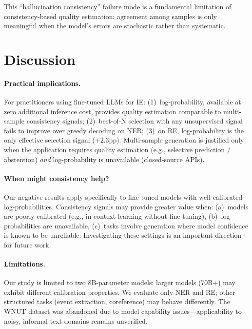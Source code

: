 \documentclass[11pt,a4paper]{article}
\begin{document}
This ``hallucination consistency'' failure mode is a fundamental limitation of consistency-based quality estimation: agreement among samples is only meaningful when the model's errors are stochastic rather than systematic.

\section{Discussion}
\label{sec:discussion}

\paragraph{Practical implications.} For practitioners using fine-tuned LLMs for IE: (1)~log-probability, available at zero additional inference cost, provides quality estimation comparable to multi-sample consistency signals; (2)~best-of-N selection with any unsupervised signal fails to improve over greedy decoding on NER; (3)~on RE, log-probability is the only effective selection signal ($+2.3$pp). Multi-sample generation is justified only when the application requires quality estimation (e.g., selective prediction / abstention) \emph{and} log-probability is unavailable (closed-source APIs).

\paragraph{When might consistency help?} Our negative results apply specifically to fine-tuned models with well-calibrated log-probabilities. Consistency signals may provide greater value when: (a)~models are poorly calibrated (e.g., in-context learning without fine-tuning), (b)~log-probabilities are unavailable, (c)~tasks involve generation where model confidence is known to be unreliable. Investigating these settings is an important direction for future work.

\paragraph{Limitations.} Our study is limited to two 8B-parameter models; larger models (70B+) may exhibit different calibration properties. We evaluate only NER and RE; other structured tasks (event extraction, coreference) may behave differently. The WNUT dataset was abandoned due to model capability issues---applicability to noisy, informal-text domains remains unverified.
\end{document}
